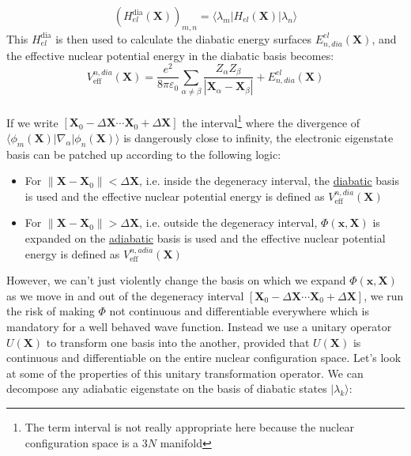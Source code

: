 \documentclass[11pt,a4paper]{article}
\begin{document}
\begin{equation*}
	(H_{el}^{\text{dia}}(\mathbf{X}))_{m,n} = \langle\lambda_m | H_{el}(\mathbf{X}) | \lambda_n \rangle
\end{equation*}
This $H_{el}^{\text{dia}}$ is then used to calculate the diabatic energy surfaces $E_{n,dia}^{el}(\mathbf{X})$, and the effective nuclear potential energy in the diabatic basis becomes:
\begin{equation*}
	V_{\text{eff}}^{n,dia}(\mathbf{X}) = \frac{e^2}{8\pi\varepsilon_0} \sum_{\alpha \neq \beta} \frac{Z_\alpha Z_\beta}{|\mathbf{X}_\alpha - \mathbf{X}_\beta|} + E_{n,dia}^{el}(\mathbf{X})
\end{equation*}
\\If we write $[\mathbf{X}_0-\Delta\mathbf{X}\cdots\mathbf{X}_0+\Delta\mathbf{X}]$ the interval\footnote{The term interval is not really appropriate here because the nuclear configuration space is a $3N$ manifold} where the divergence of $\langle\phi_m(\mathbf{X}) | \nabla_\alpha |\phi_n(\mathbf{X})\rangle$ is dangerously close to infinity, the electronic eigenstate basis can be patched up according to the following logic:
\begin{itemize}[]
	\item For $\lVert \mathbf{X} - \mathbf{X}_0 \rVert < \Delta\mathbf{X}$, i.e. inside the degeneracy interval, the \underline{diabatic} basis is used and the effective nuclear potential energy is defined as $V_{\text{eff}}^{n,dia}(\mathbf{X})$
	\item For $\lVert \mathbf{X} - \mathbf{X}_0 \rVert > \Delta\mathbf{X}$, i.e. outside the degeneracy interval, $\Phi(\mathbf{x},\mathbf{X})$ is expanded on the \underline{adiabatic} basis is used and the effective nuclear potential energy is defined as $V_{\text{eff}}^{n,adia}(\mathbf{X})$
\end{itemize}
However, we can't just violently change the basis on which we expand $\Phi(\mathbf{x},\mathbf{X})$ as we move in and out of the degeneracy interval $[\mathbf{X}_0-\Delta\mathbf{X}\cdots\mathbf{X}_0+\Delta\mathbf{X}]$, we run the risk of making $\Phi$ not continuous and differentiable everywhere which is mandatory for a well behaved wave function. Instead we use a unitary operator $U(\mathbf{X})$ to transform one basis into the another, provided that $U(\mathbf{X})$ is continuous and differentiable on the entire nuclear configuration space. Let's look at some of the properties of this unitary transformation operator. We can decompose any adiabatic eigenstate on the basis of diabatic states $|\lambda_k\rangle$:
\end{document}

